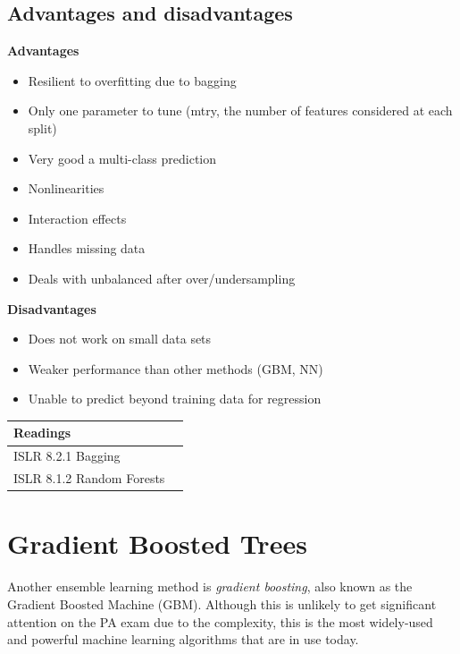 \documentclass[openany]{book}
\providecommand{\tightlist}{%
  \setlength{\itemsep}{0pt}\setlength{\parskip}{0pt}}
\begin{document}
\hypertarget{advantages-and-disadvantages-3}{%
\subsection{Advantages and disadvantages}\label{advantages-and-disadvantages-3}}

\textbf{Advantages}

\begin{itemize}
\tightlist
\item
  Resilient to overfitting due to bagging
\item
  Only one parameter to tune (mtry, the number of features considered at each split)
\item
  Very good a multi-class prediction
\item
  Nonlinearities
\item
  Interaction effects
\item
  Handles missing data
\item
  Deals with unbalanced after over/undersampling
\end{itemize}

\textbf{Disadvantages}

\begin{itemize}
\tightlist
\item
  Does not work on small data sets
\item
  Weaker performance than other methods (GBM, NN)
\item
  Unable to predict beyond training data for regression
\end{itemize}

\begin{longtable}[]{@{}ll@{}}
\toprule
Readings &\tabularnewline
\midrule
\endhead
ISLR 8.2.1 Bagging &\tabularnewline
ISLR 8.1.2 Random Forests &\tabularnewline
\bottomrule
\end{longtable}

\hypertarget{gradient-boosted-trees}{%
\section{Gradient Boosted Trees}\label{gradient-boosted-trees}}

Another ensemble learning method is \emph{gradient boosting}, also known as the Gradient Boosted Machine (GBM). Although this is unlikely to get significant attention on the PA exam due to the complexity, this is the most widely-used and powerful machine learning algorithms that are in use today.
\end{document}
